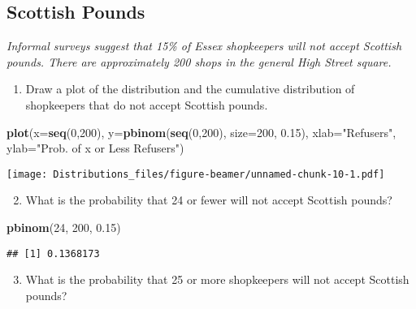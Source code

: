 \documentclass[ignorenonframetext,]{beamer}
\newenvironment{Shaded}{\begin{snugshade}}{\end{snugshade}}
\newcommand{\DataTypeTok}[1]{\textcolor[rgb]{0.13,0.29,0.53}{#1}}
\newcommand{\DecValTok}[1]{\textcolor[rgb]{0.00,0.00,0.81}{#1}}
\newcommand{\FloatTok}[1]{\textcolor[rgb]{0.00,0.00,0.81}{#1}}
\newcommand{\KeywordTok}[1]{\textcolor[rgb]{0.13,0.29,0.53}{\textbf{#1}}}
\newcommand{\NormalTok}[1]{#1}
\newcommand{\StringTok}[1]{\textcolor[rgb]{0.31,0.60,0.02}{#1}}
\providecommand{\tightlist}{%
  \setlength{\itemsep}{0pt}\setlength{\parskip}{0pt}}
\begin{document}
\hypertarget{scottish-pounds}{%
\subsection{Scottish Pounds}\label{scottish-pounds}}

\emph{Informal surveys suggest that 15\% of Essex shopkeepers will not
accept Scottish pounds. There are approximately 200 shops in the general
High Street square.}

\begin{enumerate}[<+->]
\tightlist
\item
  Draw a plot of the distribution and the cumulative distribution of
  shopkeepers that do not accept Scottish pounds.
\end{enumerate}

\begin{Shaded}
\begin{Highlighting}[]
\KeywordTok{plot}\NormalTok{(}\DataTypeTok{x=}\KeywordTok{seq}\NormalTok{(}\DecValTok{0}\NormalTok{,}\DecValTok{200}\NormalTok{), }\DataTypeTok{y=}\KeywordTok{pbinom}\NormalTok{(}\KeywordTok{seq}\NormalTok{(}\DecValTok{0}\NormalTok{,}\DecValTok{200}\NormalTok{), }\DataTypeTok{size=}\DecValTok{200}\NormalTok{, }\FloatTok{0.15}\NormalTok{), }\DataTypeTok{xlab=}\StringTok{"Refusers"}\NormalTok{, }\DataTypeTok{ylab=}\StringTok{"Prob. of x or Less Refusers"}\NormalTok{)}
\end{Highlighting}
\end{Shaded}

\texttt{[image: Distributions\_files/figure-beamer/unnamed-chunk-10-1.pdf]}

\begin{enumerate}[<+->]
\setcounter{enumi}{1}
\tightlist
\item
  What is the probability that 24 or fewer will not accept Scottish
  pounds?
\end{enumerate}

\begin{Shaded}
\begin{Highlighting}[]
\KeywordTok{pbinom}\NormalTok{(}\DecValTok{24}\NormalTok{, }\DecValTok{200}\NormalTok{, }\FloatTok{0.15}\NormalTok{)}
\end{Highlighting}
\end{Shaded}

\begin{verbatim}
## [1] 0.1368173
\end{verbatim}

\begin{enumerate}[<+->]
\setcounter{enumi}{2}
\tightlist
\item
  What is the probability that 25 or more shopkeepers will not accept
  Scottish pounds?
\end{enumerate}
\end{document}

